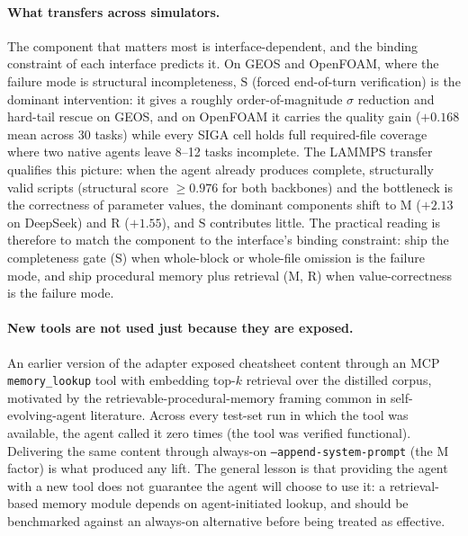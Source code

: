 \documentclass{article}
\begin{document}
\paragraph{What transfers across simulators.} The component that matters most is interface-dependent, and the binding constraint of each interface predicts it. On GEOS and OpenFOAM, where the failure mode is structural incompleteness, $\mathrm{S}$ (forced end-of-turn verification) is the dominant intervention: it gives a roughly order-of-magnitude $\sigma$ reduction and hard-tail rescue on GEOS, and on OpenFOAM it carries the quality gain ($+0.168$ mean across 30 tasks) while every SIGA cell holds full required-file coverage where two native agents leave 8--12 tasks incomplete. The LAMMPS transfer qualifies this picture: when the agent already produces complete, structurally valid scripts (structural score $\geq 0.976$ for both backbones) and the bottleneck is the correctness of parameter values, the dominant components shift to $\mathrm{M}$ ($+2.13$ on DeepSeek) and $\mathrm{R}$ ($+1.55$), and $\mathrm{S}$ contributes little. The practical reading is therefore to match the component to the interface's binding constraint: ship the completeness gate ($\mathrm{S}$) when whole-block or whole-file omission is the failure mode, and ship procedural memory plus retrieval ($\mathrm{M}$, $\mathrm{R}$) when value-correctness is the failure mode.

\paragraph{New tools are not used just because they are exposed.} An earlier version of the adapter exposed cheatsheet content through an MCP \texttt{memory\_lookup} tool with embedding top-$k$ retrieval over the distilled corpus, motivated by the retrievable-procedural-memory framing common in self-evolving-agent literature. Across every test-set run in which the tool was available, the agent called it zero times (the tool was verified functional). Delivering the same content through always-on \texttt{--append-system-prompt} (the M factor) is what produced any lift. The general lesson is that providing the agent with a new tool does not guarantee the agent will choose to use it: a retrieval-based memory module depends on agent-initiated lookup, and should be benchmarked against an always-on alternative before being treated as effective.
\end{document}

